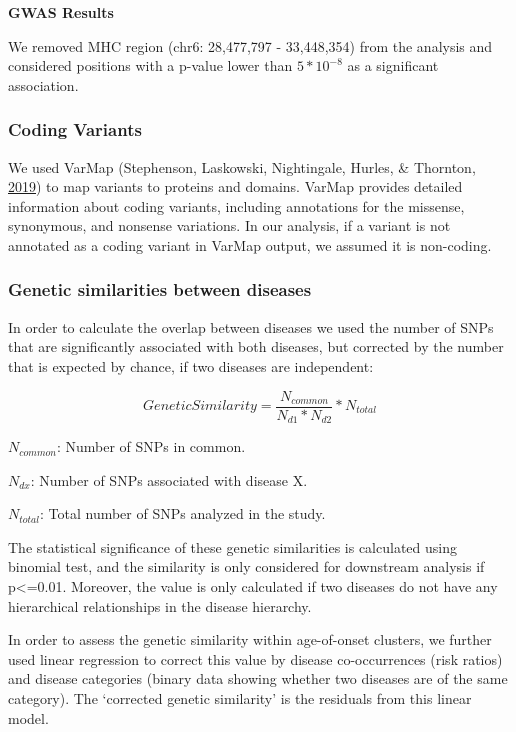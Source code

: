 \documentclass[12pt,twoside]{unicam}
\begin{document}
\textbf{GWAS Results}

We removed MHC region (chr6: 28,477,797 - 33,448,354) from the analysis and considered positions with a p-value lower than \(5*10^{-8}\) as a significant association.

\hypertarget{coding-variants}{%
\subsubsection{Coding Variants}\label{coding-variants}}

We used VarMap (Stephenson, Laskowski, Nightingale, Hurles, \& Thornton, \protect\hyperlink{ref-Stephenson2019}{2019}) to map variants to proteins and domains. VarMap provides detailed information about coding variants, including annotations for the missense, synonymous, and nonsense variations. In our analysis, if a variant is not annotated as a coding variant in VarMap output, we assumed it is non-coding.

\hypertarget{genetic-similarities-between-diseases-1}{%
\subsubsection{Genetic similarities between diseases}\label{genetic-similarities-between-diseases-1}}

In order to calculate the overlap between diseases we used the number of SNPs that are significantly associated with both diseases, but corrected by the number that is expected by chance, if two diseases are independent:

\begin{equation}
    Genetic Similarity = \dfrac{N_{common}}{N_{d1}*N_{d2}}*N_{total}
  \label{eq:disgensim}
\end{equation}

\(N_{common}\): Number of SNPs in common.

\(N_{dx}\): Number of SNPs associated with disease X.

\(N_{total}\): Total number of SNPs analyzed in the study.

The statistical significance of these genetic similarities is calculated using binomial test, and the similarity is only considered for downstream analysis if p\textless=0.01. Moreover, the value is only calculated if two diseases do not have any hierarchical relationships in the disease hierarchy.

In order to assess the genetic similarity within age-of-onset clusters, we further used linear regression to correct this value by disease co-occurrences (risk ratios) and disease categories (binary data showing whether two diseases are of the same category). The `corrected genetic similarity' is the residuals from this linear model.
\end{document}
